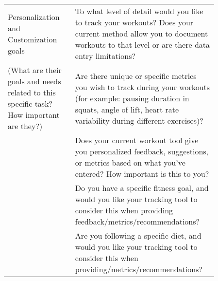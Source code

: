 \documentclass[
	letterpaper, %
]{jdf}
\begin{document}
\begin{table}[H]
\begin{tabular}{L{0.30\linewidth} L{0.56\linewidth}}
		\midrule
		Personalization and Customization goals & To what level of detail would you like to track your workouts? Does your current method allow you to document workouts to that level or are there data entry limitations?\\
		(What are their goals and needs related to this specific task? How important are they?)& Are there unique or specific metrics you wish to track during your workouts (for example: pausing duration in squats, angle of lift, heart rate variability during different exercises)?\\
		& Does your current workout tool give you personalized feedback, suggestions, or metrics based on what you've entered? How important is this to you?\\
		& Do you have a specific fitness goal, and would you like your tracking tool to consider this when providing feedback/metrics/recommendations?\\
		& Are you following a specific diet, and would you like your tracking tool to consider this when providing/metrics/recommendations?\\
	\end{tabular}
\end{table}
\end{document}
